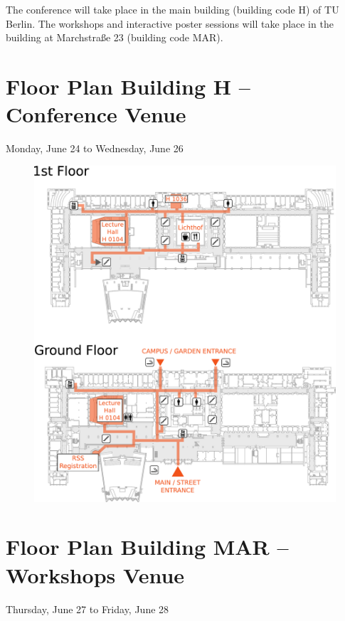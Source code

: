 The conference will take place in the main building (building code H) of TU Berlin. The workshops and interactive poster sessions will take place in the building at Marchstra{\ss}e 23 (building code MAR).

\newpage
{} \section{Floor Plan Building H -- Conference Venue}
Monday, June 24 to Wednesday, June 26
\begin{figure}[h!]
\center
\includegraphics[height=0.8\textheight]{local_img/maps/H_booklet}
\end{figure}

\newpage
{} \section{Floor Plan Building MAR -- Workshops Venue}
Thursday, June 27 to Friday, June 28

